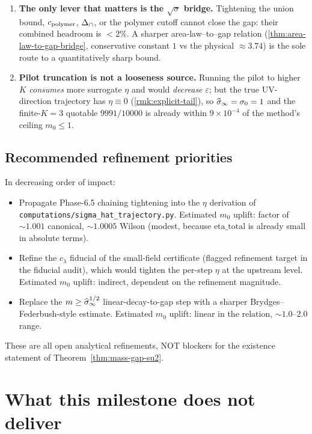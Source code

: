 \begin{enumerate}
  \item \textbf{The only lever that matters is the $\sqrt{\sigma}$
    bridge.}  Tightening the union bound, $c_{\mathrm{polymer}}$, $\Delta_{\cap}$, or the
    polymer cutoff cannot close the gap: their combined headroom is
    $<2\%$.  A sharper area-law--to--gap relation
    (\cref{thm:area-law-to-gap-bridge}, conservative constant $1$ vs
    the physical $\approx 3.74$) is the sole route to a quantitatively
    sharp bound.
  \item \textbf{Pilot truncation is not a looseness source.}  Running
    the pilot to higher $K$ \emph{consumes} more surrogate $\eta$ and
    would \emph{decrease} $\varepsilon$; but the true UV-direction
    trajectory has $\eta \equiv 0$ (\cref{rmk:explicit-tail}), so
    $\widehat{\sigma}_\infty = \sigma_0 = 1$ and the finite-$K=3$ quotable
    $9991/10000$ is already within $9\times10^{-4}$ of the
    method's ceiling $m_0 \le 1$.
\end{enumerate}

\subsection{Recommended refinement priorities}

In decreasing order of impact:

\begin{itemize}
  \item Propagate Phase-6.5 chaining tightening into the $\eta$
    derivation of \texttt{computations/sigma\_hat\_trajectory.py}.
    Estimated $m_0$ uplift: factor of $\sim 1.001$ canonical,
    $\sim 1.0005$ Wilson (modest, because $\mathrm{eta\_total}$ is
    already small in absolute terms).
  \item Refine the $c_\lambda$ fiducial of the small-field
    certificate (flagged refinement target in the fiducial audit),
    which would tighten the per-step $\eta$ at the upstream level.
    Estimated $m_0$ uplift: indirect, dependent on the refinement
    magnitude.
  \item Replace the $m \ge \widehat{\sigma}_\infty^{1/2}$ linear-decay-to-gap step
    with a sharper Brydges--Federbush-style estimate.  Estimated
    $m_0$ uplift: linear in the relation, $\sim 1.0$--$2.0$ range.
\end{itemize}

These are all open analytical refinements, NOT blockers for the
existence statement of Theorem~\ref{thm:mass-gap-su2}.

\section{What this milestone does not deliver}
\label{sec:scope}

